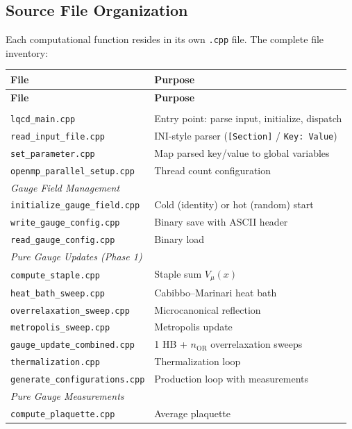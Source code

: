 \documentclass[12pt]{article}
\newcommand{\code}[1]{\texttt{#1}}
\begin{document}
\subsection{Source File Organization}

Each computational function resides in its own \code{.cpp} file. The complete file inventory:

\begin{longtable}{lp{8cm}}
\toprule
\textbf{File} & \textbf{Purpose} \\
\midrule
\endfirsthead
\toprule
\textbf{File} & \textbf{Purpose} \\
\midrule
\endhead
\bottomrule
\endlastfoot
\multicolumn{2}{l}{\textit{Infrastructure}} \\
\code{lqcd\_main.cpp} & Entry point: parse input, initialize, dispatch \\
\code{read\_input\_file.cpp} & INI-style parser (\code{[Section]} / \code{Key: Value}) \\
\code{set\_parameter.cpp} & Map parsed key/value to global variables \\
\code{openmp\_parallel\_setup.cpp} & Thread count configuration \\
\midrule
\multicolumn{2}{l}{\textit{Gauge Field Management}} \\
\code{initialize\_gauge\_field.cpp} & Cold (identity) or hot (random) start \\
\code{write\_gauge\_config.cpp} & Binary save with ASCII header \\
\code{read\_gauge\_config.cpp} & Binary load \\
\midrule
\multicolumn{2}{l}{\textit{Pure Gauge Updates (Phase 1)}} \\
\code{compute\_staple.cpp} & Staple sum $V_\mu(x)$ \\
\code{heat\_bath\_sweep.cpp} & Cabibbo--Marinari heat bath \\
\code{overrelaxation\_sweep.cpp} & Microcanonical reflection \\
\code{metropolis\_sweep.cpp} & Metropolis update \\
\code{gauge\_update\_combined.cpp} & 1 HB + $n_{\mathrm{OR}}$ overrelaxation sweeps \\
\code{thermalization.cpp} & Thermalization loop \\
\code{generate\_configurations.cpp} & Production loop with measurements \\
\midrule
\multicolumn{2}{l}{\textit{Pure Gauge Measurements}} \\
\code{compute\_plaquette.cpp} & Average plaquette \\

\end{longtable}
\end{document}

